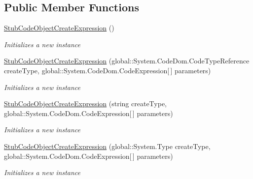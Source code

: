 \subsection*{Public Member Functions}
\begin{DoxyCompactItemize}
\item 
\hyperlink{class_system_1_1_code_dom_1_1_fakes_1_1_stub_code_object_create_expression_a2638c3f61bab2be1e01d410ff1334769}{Stub\-Code\-Object\-Create\-Expression} ()
\begin{DoxyCompactList}\small\item\em Initializes a new instance\end{DoxyCompactList}\item 
\hyperlink{class_system_1_1_code_dom_1_1_fakes_1_1_stub_code_object_create_expression_a985182c388365f72761e01ffba12cc54}{Stub\-Code\-Object\-Create\-Expression} (global\-::\-System.\-Code\-Dom.\-Code\-Type\-Reference create\-Type, global\-::\-System.\-Code\-Dom.\-Code\-Expression\mbox{[}$\,$\mbox{]} parameters)
\begin{DoxyCompactList}\small\item\em Initializes a new instance\end{DoxyCompactList}\item 
\hyperlink{class_system_1_1_code_dom_1_1_fakes_1_1_stub_code_object_create_expression_a4af95951e43651d79414fa7e3a3e9582}{Stub\-Code\-Object\-Create\-Expression} (string create\-Type, global\-::\-System.\-Code\-Dom.\-Code\-Expression\mbox{[}$\,$\mbox{]} parameters)
\begin{DoxyCompactList}\small\item\em Initializes a new instance\end{DoxyCompactList}\item 
\hyperlink{class_system_1_1_code_dom_1_1_fakes_1_1_stub_code_object_create_expression_a55ade45ad7daadc739f27f5f6b61824e}{Stub\-Code\-Object\-Create\-Expression} (global\-::\-System.\-Type create\-Type, global\-::\-System.\-Code\-Dom.\-Code\-Expression\mbox{[}$\,$\mbox{]} parameters)
\begin{DoxyCompactList}\small\item\em Initializes a new instance\end{DoxyCompactList}\end{DoxyCompactItemize}

